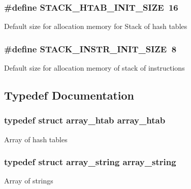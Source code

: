 \subsubsection[{S\+T\+A\+C\+K\+\_\+\+H\+T\+A\+B\+\_\+\+I\+N\+I\+T\+\_\+\+S\+I\+Z\+E}]{\setlength{\rightskip}{0pt plus 5cm}\#define S\+T\+A\+C\+K\+\_\+\+H\+T\+A\+B\+\_\+\+I\+N\+I\+T\+\_\+\+S\+I\+Z\+E~16}\label{group__structures_gaacafe24c4bd0e04c93bd17e8c669f47a}
Default size for allocation memory for Stack of hash tables \hypertarget{group__structures_ga132b2787e64d54f69abb3d2f6efa5378}{}
\subsubsection[{S\+T\+A\+C\+K\+\_\+\+I\+N\+S\+T\+R\+\_\+\+I\+N\+I\+T\+\_\+\+S\+I\+Z\+E}]{\setlength{\rightskip}{0pt plus 5cm}\#define S\+T\+A\+C\+K\+\_\+\+I\+N\+S\+T\+R\+\_\+\+I\+N\+I\+T\+\_\+\+S\+I\+Z\+E~8}\label{group__structures_ga132b2787e64d54f69abb3d2f6efa5378}
Default size for allocation memory of stack of instructions 

\subsection{Typedef Documentation}
\hypertarget{group__structures_gafa5247cb58c9cbc3aacc8616d3bd3406}{}
\subsubsection[{array\+\_\+htab}]{\setlength{\rightskip}{0pt plus 5cm}typedef struct {\bf array\+\_\+htab}  {\bf array\+\_\+htab}}\label{group__structures_gafa5247cb58c9cbc3aacc8616d3bd3406}
Array of hash tables \hypertarget{group__structures_gae454366e089196c48b5339fb91a9c7e4}{}
\subsubsection[{array\+\_\+string}]{\setlength{\rightskip}{0pt plus 5cm}typedef struct {\bf array\+\_\+string}  {\bf array\+\_\+string}}\label{group__structures_gae454366e089196c48b5339fb91a9c7e4}
Array of strings \hypertarget{group__structures_ga2942b6731254b98ce39056197f5d171a}{}
